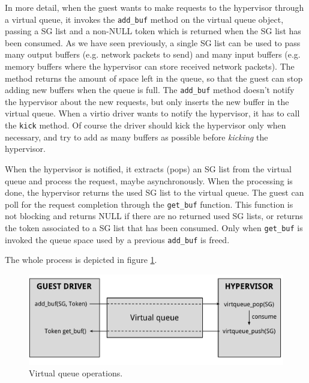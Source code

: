 \vspace{0.5cm}

In more detail, when the guest wants to make requests to the hypervisor through a virtual queue, it invokes the \texttt{add\_buf} method
on the virtual queue object, passing a SG list and a non-NULL token which is returned when the SG list has been consumed. As we have seen 
previously, a single SG list can be used to pass many output buffers (e.g. network packets to send) and many input buffers (e.g. memory 
buffers where the hypervisor can store received network packets). The method returns the amount of space left in the queue, so that 
the guest can stop adding new buffers when the queue is full.
The \texttt{add\_buf} method doesn't notify the hypervisor about the new requests, but only inserts the new buffer in the virtual queue.
When a virtio driver wants to notify the hypervisor, it has to call the \texttt{kick} method. Of course
the driver should kick the hypervisor only when necessary, and try to add as many buffers as possible before \emph{kicking} the hypervisor.

When the hypervisor is notified, it extracts (pops) an SG list from the virtual queue and process the request, maybe asynchronously.
When the processing is done, the hypervisor returns the used SG list to the virtual queue.
The guest can poll for the request completion through the \texttt{get\_buf} function. This function is not blocking and returns NULL if 
there are no returned used SG lists, or returns the token associated to a SG list that has been consumed. Only when
\texttt{get\_buf} is invoked the queue space used by a previous \texttt{add\_buf} is freed.

The whole process is depicted in figure \ref{fig:virtqueue}.

\begin{figure}[bt]
\centering
\includegraphics[scale = 0.48]{virtqueue.pdf}
\caption{Virtual queue operations.}
\label{fig:virtqueue}
\end{figure}

\vspace{0.5cm}

